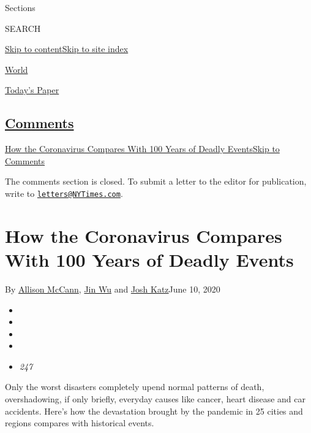 Sections

SEARCH

\protect\hyperlink{site-content}{Skip to
content}\protect\hyperlink{site-index}{Skip to site index}

\href{https://www.nytimes3xbfgragh.onion/section/world}{World}

\href{https://myaccount.nytimes3xbfgragh.onion/auth/login?response_type=cookie\&client_id=vi}{}

\href{https://www.nytimes3xbfgragh.onion/section/todayspaper}{Today's
Paper}

\hypertarget{comments}{%
\subsection{\texorpdfstring{\protect\hyperlink{commentsContainer}{Comments}}{Comments}}\label{comments}}

\href{}{How the Coronavirus Compares With 100 Years of Deadly
Events}\href{}{Skip to Comments}

The comments section is closed. To submit a letter to the editor for
publication, write to
\href{mailto:letters@NYTimes.com}{\nolinkurl{letters@NYTimes.com}}.

\hypertarget{how-the-coronavirus-compares-with-100-years-of-deadly-events}{%
\section{How the Coronavirus Compares With 100 Years of Deadly
Events}\label{how-the-coronavirus-compares-with-100-years-of-deadly-events}}

By \href{https://www.nytimes3xbfgragh.onion/by/allison-mccann}{Allison
McCann}, \href{https://www.nytimes3xbfgragh.onion/by/jin-wu}{Jin Wu} and
\href{https://www.nytimes3xbfgragh.onion/by/josh-katz}{Josh Katz}June
10, 2020

\begin{itemize}
\item
\item
\item
\item
\item
  \emph{247}
\end{itemize}

Only the worst disasters completely upend normal patterns of death,
overshadowing, if only briefly, everyday causes like cancer, heart
disease and car accidents. Here's how the devastation brought by the
pandemic in 25 cities and regions compares with historical events.


